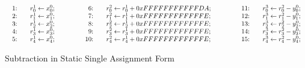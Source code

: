 \begin{figure*}
  \centering
  \[
  \begin{array}{lclcl}
    \begin{array}{rcl}
    \textmd{1:} && {r}^1_0 \leftarrow {x}^0_0; \\
    \textmd{2:} && {r}^1_1 \leftarrow {x}^0_1; \\
    \textmd{3:} && {r}^1_2 \leftarrow {x}^0_2; \\
    \textmd{4:} && {r}^1_3 \leftarrow {x}^0_3; \\
    \textmd{5:} && {r}^1_4 \leftarrow {x}^0_4; \\
    \end{array}
    &\hspace{.05\textwidth}&
    \begin{array}{rcl}
    \textmd{6:} &&
      {r}^2_0 \leftarrow {r}^1_0 + {0xFFFFFFFFFFFDA}; \\
    \textmd{7:} &&
      {r}^2_1 \leftarrow {r}^1_1 + {0xFFFFFFFFFFFFE}; \\
    \textmd{8:} &&
      {r}^2_2 \leftarrow {r}^1_2 + {0xFFFFFFFFFFFFE}; \\
    \textmd{9:} &&
      {r}^2_3 \leftarrow {r}^1_3 + {0xFFFFFFFFFFFFE}; \\
    \textmd{10:} &&
      {r}^2_4 \leftarrow {r}^1_4 + {0xFFFFFFFFFFFFE};\\
    \end{array}
    &\hspace{.05\textwidth}&
    \begin{array}{rcl}
    \textmd{11:} && {r}^3_0 \leftarrow {r}^2_0 - {y}^0_0; \\
    \textmd{12:} && {r}^3_1 \leftarrow {r}^2_1 - {y}^0_1; \\
    \textmd{13:} && {r}^3_2 \leftarrow {r}^2_2 - {y}^0_2; \\
    \textmd{14:} && {r}^3_3 \leftarrow {r}^2_3 - {y}^0_3; \\
    \textmd{15:} && {r}^3_4 \leftarrow {r}^2_4 - {y}^0_4;
    \end{array}
  \end{array}
  \]
  \caption{Subtraction  in Static Single Assignment Form}
  \label{figure:translation:subtraction-ssa}
\end{figure*}

